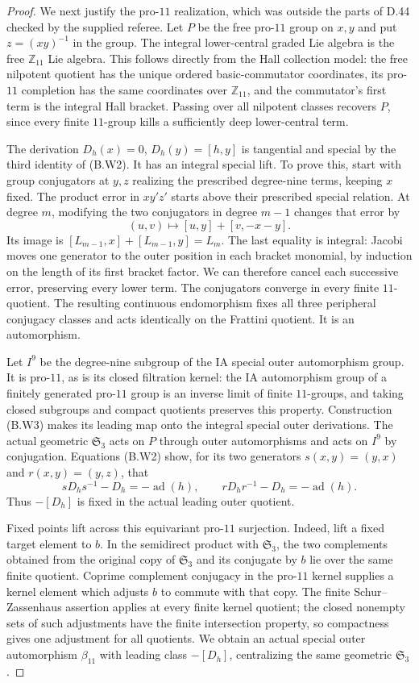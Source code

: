 \begin{proof}
We next justify the pro-$11$ realization, which was outside the
parts of D.44 checked by the supplied referee. Let $P$ be the
free pro-$11$ group on $x,y$ and put $z=(xy)^{-1}$ in the group.
The integral lower-central graded Lie algebra is the free
$\mathbb Z_{11}$ Lie algebra. This follows directly from the
Hall collection model: the free nilpotent quotient has the
unique ordered basic-commutator coordinates, its pro-$11$
completion has the same coordinates over $\mathbb Z_{11}$,
and the commutator's first term is the integral Hall bracket.
Passing over all nilpotent classes recovers $P$, since every
finite $11$-group kills a sufficiently deep lower-central term.

The derivation $D_h(x)=0$, $D_h(y)=[h,y]$ is tangential and
special by the third identity of (B.W2). It has an integral
special lift. To prove this, start with group conjugators at
$y,z$ realizing the prescribed degree-nine terms, keeping $x$
fixed. The product error in $xy'z'$ starts above their
prescribed special relation. At degree $m$, modifying the
two conjugators in degree $m-1$ changes that error by
\[
          (u,v)\longmapsto[u,y]+[v,-x-y].                 \tag{B.W3}
\]
Its image is $[L_{m-1},x]+[L_{m-1},y]=L_m$.
The last equality is integral: Jacobi moves one generator
to the outer position in each bracket monomial, by induction
on the length of its first bracket factor. We can therefore
cancel each successive error, preserving every lower term.
The conjugators converge in every finite $11$-quotient.
The resulting continuous endomorphism fixes all three
peripheral conjugacy classes and acts identically on the
Frattini quotient. It is an automorphism.

Let $I^9$ be the degree-nine subgroup of the IA special
outer automorphism group. It is pro-$11$, as is its closed
filtration kernel: the IA automorphism group of a finitely
generated pro-$11$ group is an inverse limit of finite
$11$-groups, and taking closed subgroups and compact
quotients preserves this property. Construction (B.W3)
makes its leading map onto the integral special outer
derivations. The actual geometric $\mathfrak S_3$ acts
on $P$ through outer automorphisms and acts on $I^9$
by conjugation. Equations (B.W2) show, for its two
generators $s(x,y)=(y,x)$ and $r(x,y)=(y,z)$, that
\[
 sD_hs^{-1}-D_h=-\operatorname{ad}(h),\qquad
 rD_hr^{-1}-D_h=-\operatorname{ad}(h).
\]
Thus $-[D_h]$ is fixed in the actual leading outer quotient.

Fixed points lift across this equivariant pro-$11$
surjection. Indeed, lift a fixed target element to $b$.
In the semidirect product with $\mathfrak S_3$, the
two complements obtained from the original copy of
$\mathfrak S_3$ and its conjugate by $b$ lie over the
same finite quotient. Coprime complement conjugacy in
the pro-$11$ kernel supplies a kernel element which
adjusts $b$ to commute with that copy. The finite
Schur--Zassenhaus assertion applies at every finite
kernel quotient; the closed nonempty sets of such
adjustments have the finite intersection property,
so compactness gives one adjustment for all quotients.
We obtain an actual special outer automorphism
$\beta_{11}$ with leading class $-[D_h]$, centralizing
the same geometric $\mathfrak S_3$.


\end{proof}
